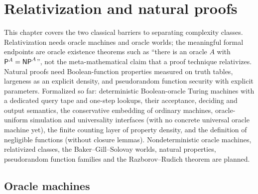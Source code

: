 \chapter{Relativization and natural proofs}
\label{chap:barriers}

This chapter covers the two classical barriers to separating complexity
classes. Relativization needs oracle machines and oracle worlds; the meaningful
formal endpoints are oracle existence theorems such as ``there is an oracle $A$
with $\mathsf{P}^A = \mathsf{NP}^A$'', not the meta-mathematical claim that a proof
technique relativizes. Natural proofs need Boolean-function properties measured
on truth tables, largeness as an explicit density, and pseudorandom function
security with explicit parameters. Formalized so far: deterministic
Boolean-oracle Turing machines with a dedicated query tape and one-step lookups,
their acceptance, deciding and output semantics, the conservative embedding of
ordinary machines, oracle-uniform simulation and universality interfaces (with
no concrete universal oracle machine yet), the finite counting layer of
property density, and the definition of negligible functions (without closure
lemmas). Nondeterministic oracle machines, relativized classes, the
Baker--Gill--Solovay worlds, natural properties, pseudorandom function
families and the Razborov--Rudich theorem are planned.

\section{Oracle machines}

